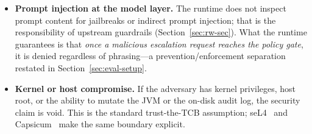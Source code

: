 \begin{itemize}
    \item \textbf{Prompt injection at the model layer.} The runtime
    does not inspect prompt content for jailbreaks or indirect prompt
    injection; that is the responsibility of upstream guardrails
    (Section~\ref{sec:rw-sec}). What the runtime guarantees is that
    \emph{once a malicious escalation request reaches the policy gate},
    it is denied regardless of phrasing---a prevention/enforcement
    separation restated in Section~\ref{sec:eval-setup}.

    \item \textbf{Kernel or host compromise.} If the adversary has
    kernel privileges, host root, or the ability to mutate the JVM or
    the on-disk audit log, the security claim is void. This is the
    standard trust-the-TCB assumption; seL4~\cite{klein2009sel4} and
    Capsicum~\cite{mercer2012capsicum} make the same boundary
    explicit.


\end{itemize}
